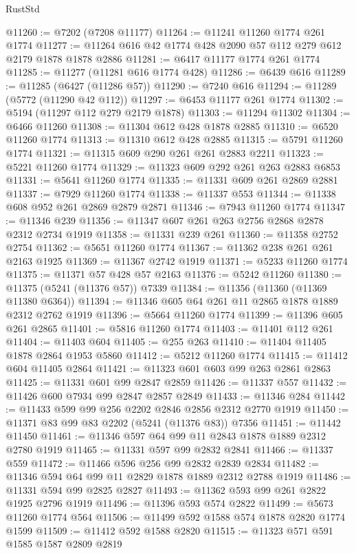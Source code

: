 \begin{lexlean}{RustStd}
\begin{coremodule}
@11260 := @7202 (@7208 @11177)
@11264 := @11241 @11260 @1774 @261 @1774
@11277 := @11264 @616 @42 @1774 @428 @2090 @57 @112 @279 @612 @2179 @1878 @1878 @2886
@11281 := @6417 @11177 @1774 @261 @1774
@11285 := @11277 (@11281 @616 @1774 @428)
@11286 := @6439 @616
@11289 := @11285 (@6427 (@11286 @57))
@11290 := @7240 @616
@11294 := @11289 (@5772 (@11290 @42 @112))
@11297 := @6453 @11177 @261 @1774
@11302 := @5194 (@11297 @112 @279 @2179 @1878)
@11303 := @11294 @11302
@11304 := @6466 @11260
@11308 := @11304 @612 @428 @1878 @2885
@11310 := @6520 @11260 @1774
@11313 := @11310 @612 @428 @2885
@11315 := @5791 @11260 @1774
@11321 := @11315 @609 @290 @261 @261 @2883 @2211
@11323 := @5221 @11260 @1774
@11329 := @11323 @609 @292 @261 @263 @2883 @6853
@11331 := @5641 @11260 @1774
@11335 := @11331 @609 @261 @2869 @2881
@11337 := @7929 @11260 @1774
@11338 := @11337 @553
@11344 := @11338 @608 @952 @261 @2869 @2879 @2871
@11346 := @7943 @11260 @1774
@11347 := @11346 @239
@11356 := @11347 @607 @261 @263 @2756 @2868 @2878 @2312 @2734 @1919
@11358 := @11331 @239 @261
@11360 := @11358 @2752 @2754
@11362 := @5651 @11260 @1774
@11367 := @11362 @238 @261 @261 @2163 @1925
@11369 := @11367 @2742 @1919
@11371 := @5233 @11260 @1774
@11375 := @11371 @57 @428 @57 @2163
@11376 := @5242 @11260
@11380 := @11375 (@5241 (@11376 @57)) @7339
@11384 := @11356 (@11360 (@11369 @11380 @6364))
@11394 := @11346 @605 @64 @261 @11 @2865 @1878 @1889 @2312 @2762 @1919
@11396 := @5664 @11260 @1774
@11399 := @11396 @605 @261 @2865
@11401 := @5816 @11260 @1774
@11403 := @11401 @112 @261
@11404 := @11403 @604
@11405 := @255 @263
@11410 := @11404 @11405 @1878 @2864 @1953 @5860
@11412 := @5212 @11260 @1774
@11415 := @11412 @604 @11405 @2864
@11421 := @11323 @601 @603 @99 @263 @2861 @2863
@11425 := @11331 @601 @99 @2847 @2859
@11426 := @11337 @557
@11432 := @11426 @600 @7934 @99 @2847 @2857 @2849
@11433 := @11346 @284
@11442 := @11433 @599 @99 @256 @2202 @2846 @2856 @2312 @2770 @1919
@11450 := @11371 @83 @99 @83 @2202 (@5241 (@11376 @83)) @7356
@11451 := @11442 @11450
@11461 := @11346 @597 @64 @99 @11 @2843 @1878 @1889 @2312 @2780 @1919
@11465 := @11331 @597 @99 @2832 @2841
@11466 := @11337 @559
@11472 := @11466 @596 @256 @99 @2832 @2839 @2834
@11482 := @11346 @594 @64 @99 @11 @2829 @1878 @1889 @2312 @2788 @1919
@11486 := @11331 @594 @99 @2825 @2827
@11493 := @11362 @593 @99 @261 @2822 @1925 @2796 @1919
@11496 := @11396 @593 @574 @2822
@11499 := @5673 @11260 @1774 @564
@11506 := @11499 @592 @1588 @574 @1878 @2820 @1774 @1599
@11509 := @11412 @592 @1588 @2820
@11515 := @11323 @571 @591 @1585 @1587 @2809 @2819

\end{coremodule}
\end{lexlean}
